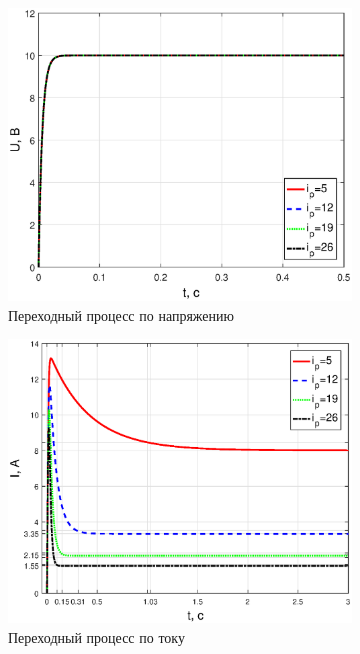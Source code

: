 \documentclass[12pt,a4paper]{article}
\begin{document}
\begin{figure}[H]
	\centering
	\begin{subfigure}[b]{0.48\textwidth}
	    \includegraphics[width = \textwidth]{U3_44}
		\caption{Переходный процесс по напряжению}
	\end{subfigure}
	\hfill
	\begin{subfigure}[b]{0.48\textwidth}
		\includegraphics[width = \textwidth]{I3_44}
		\caption{Переходный процесс по току}
	\end{subfigure}
	\begin{subfigure}[b]{0.48\textwidth}

\end{subfigure}
\end{figure}
\end{document}

